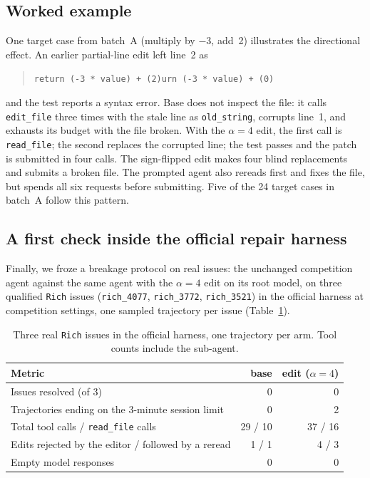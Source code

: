 \documentclass[11pt]{article}
\begin{document}
\subsection{Worked example}\label{sec:example}
One target case from batch~A (multiply by $-3$, add~2) illustrates the directional effect. An earlier partial-line edit left line~2 as
\begin{quote}\small\texttt{return (-3 * value) + (2)urn (-3 * value) + (0)}\end{quote}
and the test reports a syntax error. Base does not inspect the file: it calls \texttt{edit\_file} three times with the stale line as \texttt{old\_string}, corrupts line~1, and exhausts its budget with the file broken. With the $\alpha=4$ edit, the first call is \texttt{read\_file}; the second replaces the corrupted line; the test passes and the patch is submitted in four calls. The sign-flipped edit makes four blind replacements and submits a broken file. The prompted agent also rereads first and fixes the file, but spends all six requests before submitting. Five of the 24 target cases in batch~A follow this pattern.

\subsection{A first check inside the official repair harness}\label{sec:real}
Finally, we froze a breakage protocol on real issues: the unchanged competition agent against the same agent with the $\alpha=4$ edit on its root model, on three qualified \texttt{Rich} issues (\texttt{rich\_4077}, \texttt{rich\_3772}, \texttt{rich\_3521}) in the official harness at competition settings, one sampled trajectory per issue (Table~\ref{tab:real}).

\begin{table}[ht]
\centering
\caption{Three real \texttt{Rich} issues in the official harness, one trajectory per arm. Tool counts include the sub-agent.}
\label{tab:real}
\vspace{2pt}
\begin{tabular}{lrr}
\toprule
Metric & base & edit ($\alpha=4$) \\ \midrule
Issues resolved (of 3) & 0 & 0 \\
Trajectories ending on the 3-minute session limit & 0 & 2 \\
Total tool calls / \texttt{read\_file} calls & 29 / 10 & 37 / 16 \\
Edits rejected by the editor / followed by a reread & 1 / 1 & 4 / 3 \\
Empty model responses & 0 & 0 \\ \bottomrule
\end{tabular}
\end{table}
\end{document}
